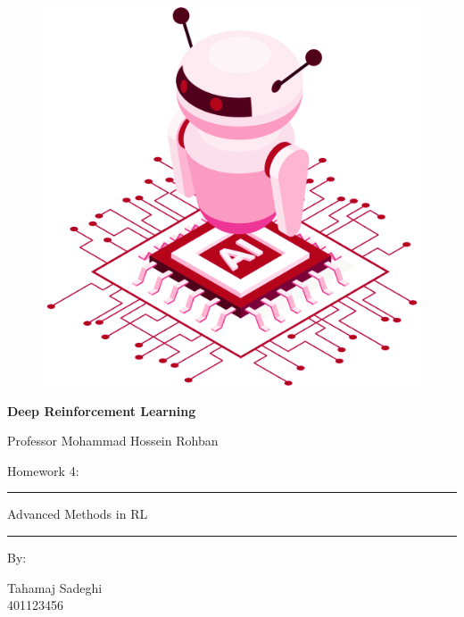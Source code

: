 \documentclass[12pt]{article}
\begin{document}
\thispagestyle{plain}

\begin{center}

\vspace*{-1.5cm}
\begin{figure}[!h]
    \centering
    \includegraphics[width=0.7\linewidth]{figs/cover-std.png}
\end{figure}

{

{\color{DarkBlue} {\fontsize{30}{50} \textbf{
Deep Reinforcement Learning
}}}

{\color{DarkBlue} {\Large
Professor Mohammad Hossein Rohban
}}
}


\vspace{20pt}

{


{\color{RedOrange}
{\Large
Homework 4:
}\\
}
{\color{BrickRed}
\rule{12cm}{0.5pt}

{\Huge
Advanced Methods in RL
}
\rule{12cm}{0.5pt}
}

\vspace{10pt}

{\color{RoyalPurple} { \small By:} } \\
\vspace{10pt}

{\color{Blue} { \LARGE Tahamaj Sadeghi } } \\
\vspace{5pt}
{\color{RoyalBlue} { \Large 401123456 } }


}
\end{center}
\end{document}

